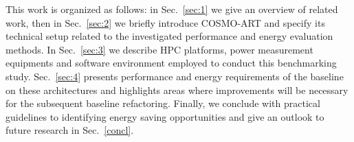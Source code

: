 This  work is  organized as  follows: in  Sec.~\ref{sec:1} we  give an
overview  of  related  work,   then  in  Sec.~\ref{sec:2}  we  briefly
introduce  COSMO-ART and specify  its technical  setup related  to the
investigated   performance   and   energy  evaluation   methods.    In
Sec.~\ref{sec:3}   we  describe   HPC  platforms,   power  measurement
equipments   and  software  environment   employed  to   conduct  this
benchmarking study.  Sec.~\ref{sec:4}  presents performance and energy
requirements  of the  baseline on  these architectures  and highlights
areas where improvements will be necessary for the subsequent baseline
refactoring.   Finally,  we  conclude  with  practical  guidelines  to
identifying energy saving opportunities  and give an outlook to future
research in Sec.~\ref{concl}.
